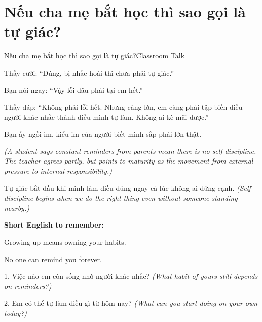 \section{Nếu cha mẹ bắt học thì sao gọi là tự giác?}
\begin{truyen}{Nếu cha mẹ bắt học thì sao gọi là tự giác?}{Classroom Talk}

Thầy cười: ``Đúng, bị nhắc hoài thì chưa phải tự giác.''

Bạn nói ngay: ``Vậy lỗi đâu phải tại em hết.''

Thầy đáp: ``Không phải lỗi hết. Nhưng càng lớn, em càng phải tập biến điều người khác nhắc thành điều mình tự làm. Không ai kè mãi được.''

Bạn ấy ngồi im, kiểu im của người biết mình sắp phải lớn thật.

\textit{(A student says constant reminders from parents mean there is no self-discipline. The teacher agrees partly, but points to maturity as the movement from external pressure to internal responsibility.)}
\end{truyen}

\begin{baihoc}
Tự giác bắt đầu khi mình làm điều đúng ngay cả lúc không ai đứng cạnh.
\textit{(Self-discipline begins when we do the right thing even without someone standing nearby.)}
\end{baihoc}

\begin{ghinhoanh}
\textbf{Short English to remember:}

Growing up means owning your habits.

No one can remind you forever.
\end{ghinhoanh}

\begin{tuhocnhanh}
1. Việc nào em còn sống nhờ người khác nhắc? \textit{(What habit of yours still depends on reminders?)}

2. Em có thể tự làm điều gì từ hôm nay? \textit{(What can you start doing on your own today?)}
\end{tuhocnhanh}
\ngancach

